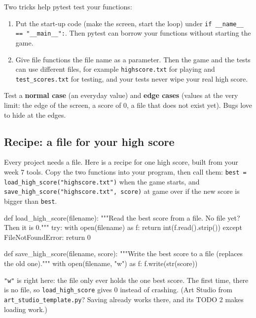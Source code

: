 Two tricks help pytest test your functions:
\begin{enumerate}
  \item Put the start-up code (make the screen, start the loop) under \texttt{if \_\_name\_\_ == "\_\_main\_\_":}. Then pytest can borrow your functions without starting the game.
  \item Give file functions the file name as a parameter. Then the game and the tests can use different files, for example \texttt{highscore.txt} for playing and \texttt{test\_scores.txt} for testing, and your tests never wipe your real high score.
\end{enumerate}

Test a \textbf{normal case} (an everyday value) and \textbf{edge cases} (values at the very limit:
the edge of the screen, a score of 0, a file that does not exist yet). Bugs love to hide at the edges.

\subsection{Recipe: a file for your high score}
Every project needs a file. Here is a recipe for one high score, built from your week 7 tools. Copy the two functions into
your program, then call them: \texttt{best = load\_high\_score("highscore.txt")} when the game starts, and
\texttt{save\_high\_score("highscore.txt", score)} at game over if the new score is bigger than \texttt{best}.
\begin{pycode}
def load_high_score(filename):
    """Read the best score from a file. No file yet? Then it is 0."""
    try:
        with open(filename) as f:
            return int(f.read().strip())
    except FileNotFoundError:
        return 0

def save_high_score(filename, score):
    """Write the best score to a file (replaces the old one)."""
    with open(filename, "w") as f:
        f.write(str(score))
\end{pycode}
\texttt{"w"} is right here: the file only ever holds the one best score. The first time, there is no file,
so \texttt{load\_high\_score} gives 0 instead of crashing. (Art Studio from \texttt{art\_studio\_template.py}? Saving already
works there, and its TODO 2 makes loading work.)

